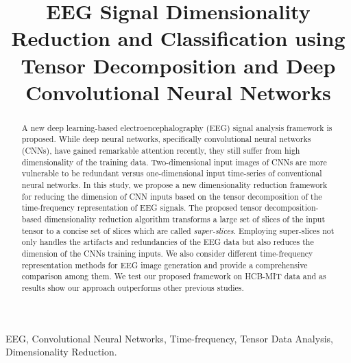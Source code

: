 \documentclass{article}
\begin{document}
\title{EEG Signal Dimensionality Reduction and Classification using Tensor Decomposition and Deep Convolutional Neural Networks}
\address{Department of Electrical \& Computer Engineering\\
University of Central Florida, Orlando, USA\\ 
Emails: \{taherisadr@knights, joneidi@ece, nazanin@ece\}.ucf.edu}












\maketitle
\vspace{-4mm}
\begin{abstract}
\vspace{-5pt}
A new deep learning-based electroencephalography (EEG) signal analysis framework is proposed. While deep neural networks, specifically convolutional neural networks (CNNs), have gained remarkable attention recently, they still suffer from high dimensionality of the training data. 
Two-dimensional input images of CNNs are more vulnerable to be redundant versus one-dimensional input time-series of conventional neural networks.
In this study, we propose a new dimensionality reduction framework for reducing the dimension of CNN inputs based on the tensor decomposition of the time-frequency representation of EEG signals. The proposed tensor decomposition-based dimensionality reduction algorithm transforms a large set of slices of the input tensor to a concise set of slices which are called \emph{super-slices}. Employing super-slices not only handles the artifacts and redundancies of the EEG data but also reduces the dimension of the CNNs training inputs. We also consider different time-frequency representation methods for EEG image generation and provide a comprehensive comparison among them. We test our proposed framework on HCB-MIT data and as results show our approach outperforms other previous studies.      
\end{abstract}
\begin{keywords}
EEG, Convolutional Neural Networks, Time-frequency, Tensor Data Analysis, Dimensionality Reduction.
\vspace{-5pt}
\end{keywords}
\vspace{-3mm}
\end{document}
